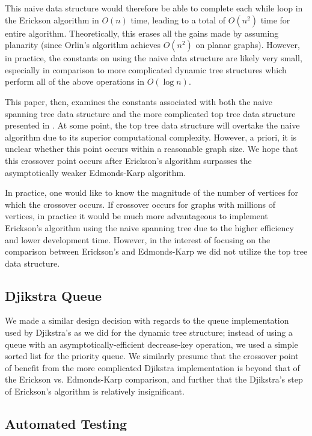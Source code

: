 \documentclass[12pt]{article}
\begin{document}
This naive data structure would therefore be able to complete each while loop in the Erickson algorithm in $O(n)$ time, leading to a total of $O(n^2)$ time for entire algorithm. Theoretically, this erases all the gains made by assuming planarity (since Orlin's algorithm achieves $O(n^2)$ on planar graphs). However, in practice, the constants on using the naive data structure are likely very small, especially in comparison to more complicated dynamic tree structures which perform all of the above operations in $O(\log n)$. 

This paper, then, examines the constants associated with both the naive spanning tree data structure and the more complicated top tree data structure presented in \cite{tarjanwerneck2005}. At some point, the top tree data structure will overtake the naive algorithm due to its superior computational complexity. However, a priori, it is unclear whether this point occurs within a reasonable graph size.  We hope that this crossover point occurs after Erickson's algorithm surpasses the asymptotically weaker Edmonds-Karp algorithm.

In practice, one would like to know the magnitude of the number of vertices for which the crossover occurs. If crossover occurs for graphs with millions of vertices, in practice it would be much more advantageous to implement Erickson's algorithm using the naive spanning tree due to the higher efficiency and lower development time.  However, in the interest of focusing on the comparison between Erickson's and Edmonds-Karp we did not utilize the top tree data structure.

\subsection{Djikstra Queue}

We made a similar design decision with regards to the queue implementation used by Djikstra's as we did for the dynamic tree structure; instead of using a queue with an asymptotically-efficient decrease-key operation, we used a simple sorted list for the priority queue.  We similarly presume that the crossover point of benefit from the more complicated Djikstra implementation is beyond that of the Erickson vs. Edmonds-Karp comparison, and further that the Djikstra's step of Erickson's algorithm is relatively insignificant.

\subsection{Automated Testing}
\end{document}
